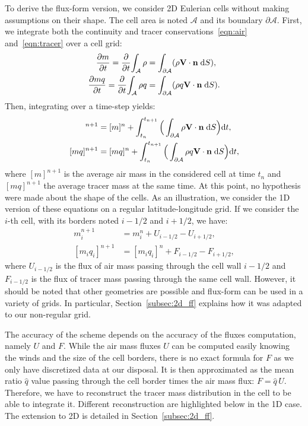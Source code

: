 To derive the flux-form version, we consider 2D Eulerian cells without making
assumptions on their shape. The cell area is noted $\mathcal{A}$ and its
boundary $\partial \mathcal{A}$. First, we integrate both the continuity and
tracer conservations~\eqref{eqn:air} and~\eqref{eqn:tracer} over a cell grid:
\begin{align}
  \frac{\partial m}{\partial t}=\frac{\partial}{\partial t} {\int_{\mathcal{A}}
\rho}
&= \int_{\partial \mathcal{A}} (\rho {\bf V}\cdot{\bf n} \;\mathrm{d}S),
\label{eqn:air2}\\
\frac{\partial mq}{\partial t}=\frac{\partial}{\partial t} {\int_{\mathcal{A}}
\rho q} &= \int_{\partial \mathcal{A}} (\rho q {\bf V}\cdot {\bf n} \;\mathrm{d}S).
\label{eqn:tracer2}
\end{align}
Then, integrating over a time-step yields:
\begin{align}
[m]^{n+1} &= [ m]^{n} + \int_{t_n}^{t_{n+1}}
\Big( \int_{\partial \mathcal{A}} \rho {\bf V}\cdot{\bf n}\;\mathrm{d}S \Big) \mathrm{d}t,
\label{eqn:mintegral} \\
[ mq]^{n+1} &= [ mq]^{n} + \int_{t_n}^{t_{n+1}}
\Big( \int_{\partial \mathcal{A}} \rho q {\bf V}\cdot{\bf n}\;\mathrm{d}S \Big) \mathrm{d}t,
\label{eqn:qintegral}
   \end{align}
where $[m]^{n+1}$ is the average air mass in the considered cell at time $t_n$
and $[mq]^{n+1}$ the average tracer mass at the same time.
At this point, no hypothesis were made about the shape of the cells.
As an illustration, we consider the 1D version of these equations on a regular
latitude-longitude grid. If we consider the $i$-th cell, with its borders noted
$i-1/2$ and $i+1/2$, we have:
\begin{align}
  \label{eqn:air_update}
  {m}_i^{n+1} &= m_i^{n} + U_{i-1/2} - U_{i+1/2},\\
  \label{eqn:tracer_update}
  [{m_iq_i}]^{n+1} &= [m_iq_i]^{n} + F_{i-1/2} - F_{i+1/2},
\end{align}
where $U_{i-1/2}$ is the flux of air mass passing through the cell wall $i-1/2$ and
$F_{i-1/2}$ is the flux of tracer mass passing through the same cell wall.
However, it should be noted that other geometries are possible and flux-form can
be used in a variety of grids. In particular, Section~\ref{subsec:2d_ff} explains how it was
adapted to our non-regular grid.

The accuracy of the scheme depends on the accuracy of the fluxes computation,
namely $U$ and $F$. While the air mass fluxes $U$ can be computed easily knowing
the winds and the size of the cell borders, there is no exact formula for $F$ as
we only have discretized data at our disposal.  It is then approximated as the
mean ratio $\hat{q}$ value passing through the cell border times the air mass
flux: $F=\hat{q}\,U$. Therefore, we have to reconstruct the tracer mass
distribution in the cell to be able to integrate it. Different reconstruction
are highlighted below in the 1D case. The extension to 2D is detailed in
Section~\ref{subsec:2d_ff}.


